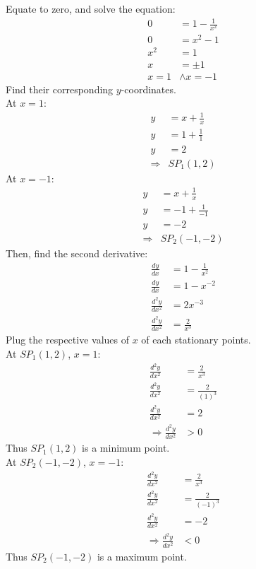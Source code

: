 \documentclass[hidelinks, a4paper, 12pt]{article}
\newcommand{\n}{\\[\baselineskip]}
\newcommand{\thus}{\Rightarrow}
\newcommand{\dydx}{\frac{dy}{dx}}
\newcommand{\dydxx}{\frac{d^2y}{dx^2}}
\begin{document}
                Equate to zero, and solve the equation:
                \[\begin{split}
                    0 &= 1 -\frac{1}{x^2}\\
                    0 &= x^2 - 1\\
                    x^2 &= 1\\
                    x &= \pm 1\\
                    x = 1 &\land x = -1
                \end{split}\]
                Find their corresponding $y$-coordinates.\n
                At $x = 1$:
                \[\begin{split}
                    y &= x + \frac{1}{x}\\
                    y &= 1 + \frac{1}{1}\\
                    y &= 2\\
                    \thus &SP_1(1,2)
                \end{split}\]
                At $x = -1$:
                \[\begin{split}
                    y &= x + \frac{1}{x}\\
                    y &= -1 + \frac{1}{-1}\\
                    y &= -2\\
                    \thus &SP_2(-1,-2)
                \end{split}\]
                Then, find the second derivative:
                \[\begin{split}
                    \dydx &= 1 -\frac{1}{x^2}\\
                    \dydx &= 1 -x^{-2}\\
                    \dydxx &= 2x^{-3}\\
                    \dydxx &= \frac{2}{x^3}
                \end{split}\]
                Plug the respective values of $x$ of each stationary points.\n
                At $SP_1(1,2)$, $x=1$:
                \[\begin{split}
                    \dydxx &= \frac{2}{x^3}\\
                    \dydxx &= \frac{2}{(1)^3}\\
                    \dydxx &= 2\\
                    \thus \dydxx &> 0
                \end{split}\]
                Thus $SP_1(1,2)$ is a minimum point.\n
                At $SP_2(-1,-2)$, $x=-1$:
                \[\begin{split}
                    \dydxx &= \frac{2}{x^3}\\
                    \dydxx &= \frac{2}{(-1)^3}\\
                    \dydxx &= -2\\
                    \thus \dydxx &< 0
                \end{split}\]
                Thus $SP_2(-1,-2)$ is a maximum point.
\end{document}

